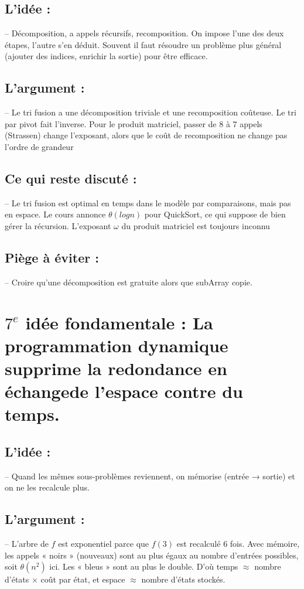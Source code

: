 \documentclass{article}
\begin{document}
\subsection*{\textbf{L'idée} :}
\qquad -- Décomposition, a appels récursifs, recomposition. On impose l'une des deux étapes, l'autre s'en déduit. Souvent il faut résoudre un problème plus général (ajouter des indices, enrichir la sortie) pour être efficace.


\subsection*{\textbf{L'argument} :}
\qquad -- Le tri fusion a une décomposition triviale et une recomposition coûteuse. Le tri par pivot fait l'inverse. Pour le produit matriciel, passer de 8 à 7 appels (Strassen) change l'exposant, alors que le coût de recomposition ne change pas l'ordre de grandeur


\subsection*{\textbf{Ce qui reste discuté} :}
\qquad -- Le tri fusion est optimal en temps dans le modèle par comparaisons, mais pas en espace. Le cours annonce $\theta(log n)$ pour QuickSort, ce qui suppose de bien gérer la récursion. L'exposant $\omega$ du produit matriciel est toujours inconnu


\subsection*{\textbf{Piège à éviter} :}
\qquad -- Croire qu'une décomposition est gratuite alors que subArray copie.

\section*{\textbf{$7^e$ idée fondamentale} : La programmation dynamique supprime la redondance en échangede l'espace contre du temps.}


\subsection*{\textbf{L'idée} : }
\qquad -- Quand les mêmes sous-problèmes reviennent, on mémorise (entrée → sortie) et on ne les recalcule plus.


\subsection*{\textbf{L'argument} :}
\qquad -- L'arbre de $f$ est exponentiel parce que $f(3)$ est recalculé 6 fois. Avec mémoire, les appels « noirs » (nouveaux) sont au plus égaux au nombre d'entrées possibles, soit $\theta(n^2)$ ici. Les « bleus » sont au plus le double. D'où temps $\approx$ nombre d'états $\times$ coût par état, et espace $\approx$ nombre d'états stockés.
\end{document}
